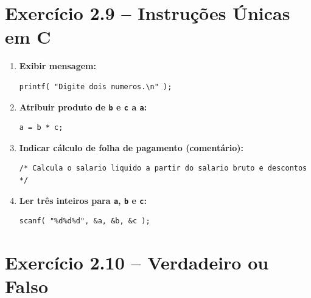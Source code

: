\documentclass[12pt,a4paper]{article}
\begin{document}
\section{Exercício 2.9 -- Instruções Únicas em C}

\begin{respostabox}[title={Exercício 2.9}]
\begin{enumerate}[label=\textbf{\alph*)}]
\item \textbf{Exibir mensagem:}
\begin{lstlisting}
printf( "Digite dois numeros.\n" );
\end{lstlisting}

\item \textbf{Atribuir produto de \texttt{b} e \texttt{c} a \texttt{a}:}
\begin{lstlisting}
a = b * c;
\end{lstlisting}

\item \textbf{Indicar cálculo de folha de pagamento (comentário):}
\begin{lstlisting}
/* Calcula o salario liquido a partir do salario bruto e descontos */
\end{lstlisting}

\item \textbf{Ler três inteiros para \texttt{a}, \texttt{b} e \texttt{c}:}
\begin{lstlisting}
scanf( "%d%d%d", &a, &b, &c );
\end{lstlisting}
\end{enumerate}
\end{respostabox}

\section{Exercício 2.10 -- Verdadeiro ou Falso}
\end{document}
